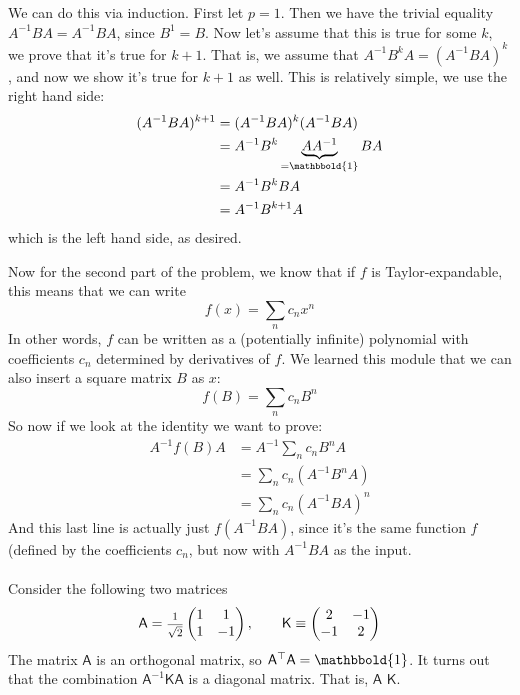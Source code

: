 \documentclass{article}
\begin{document}
\begin{solution}
	We can do this via induction. First let $p = 1$. Then we have the trivial equality $A^{-1}BA = A^{-1}BA$, 
	since $B^{1} = B$. Now let's assume that this is true for some $k$, we prove that it's true for $k+1$.
	That is, we assume that $A^{-1}B^kA = (A^{-1}BA)^k$, and now we show it's true for $k+1$ as well. This is 
	relatively simple, we use the right hand side:
	\begin{align*}
		(A^{-1}BA)^{k+1} &= (A^{-1}BA)^k(A^{-1}BA)\\	
						 &= A^{-1}B^k\underbrace{A A^{-1}}_{=\mathbbold{1}}BA \\
						 &= A^{-1}B^kBA \\
						 &= A^{-1}B^{k+1}A 
	\end{align*}
	which is the left hand side, as desired. 

	Now for the second part of the problem, we know that if $f$ is Taylor-expandable, this means that we 
	can write 
	\[
	f(x) = \sum_n c_n x^n
	\] 
	In other words, $f$ can be written as a (potentially infinite) polynomial with coefficients $c_n$ determined
	by derivatives of $f$. We learned this module that we can also insert a square matrix $B$ as $x$:
	\[
	f(B) = \sum_n c_n B^n
	\] 
	So now if we look at the identity we want to prove: 
	\begin{align*}
		A^{-1}f(B)A &= A^{-1} \sum_n c_n B^n A\\
					&= \sum_n c_n(A^{-1}B^nA) \\
					&= \sum_n c_n(A^{-1}BA)^n 
	\end{align*}
	And this last line is actually just $f(A^{-1}BA)$, since it's the same function $f$ (defined by the 
	coefficients $c_n$, but now with $A^{-1}BA$ as the input. 
	
\end{solution}
\paragraph{}
Consider the following two matrices 
	\begin{equation*}
		\mathsf{A} = \fracsm{1}{\sqrt{2}}\twotwomat{1}{1}{1}{-1},	\qquad	\mathsf{K} \equiv \twotwomat{2}{-1}{-1}{2}
	\end{equation*}
The matrix $\mathsf{A}$ is an orthogonal matrix, so $\mathsf{A}^{\T}\mathsf{A} = \mathbbold{1}$.  It turns out that the combination $\mathsf{A}^{-1}\mathsf{K}\mathsf{A}$
is a diagonal matrix.  That is, $\mathsf{A}$  $\mathsf{K}$.
\end{document}
